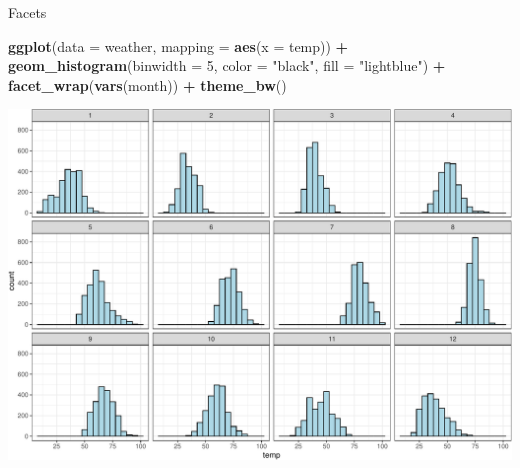 \documentclass[
  ignorenonframetext,
]{beamer}
\newenvironment{Shaded}{\begin{snugshade}}{\end{snugshade}}
\newcommand{\AttributeTok}[1]{\textcolor[rgb]{0.13,0.29,0.53}{#1}}
\newcommand{\DecValTok}[1]{\textcolor[rgb]{0.00,0.00,0.81}{#1}}
\newcommand{\FunctionTok}[1]{\textcolor[rgb]{0.13,0.29,0.53}{\textbf{#1}}}
\newcommand{\NormalTok}[1]{#1}
\newcommand{\SpecialCharTok}[1]{\textcolor[rgb]{0.81,0.36,0.00}{\textbf{#1}}}
\newcommand{\StringTok}[1]{\textcolor[rgb]{0.31,0.60,0.02}{#1}}
\begin{document}
\begin{frame}[fragile]{Facets}
\protect\hypertarget{facets-1}{}
\tiny

\begin{Shaded}
\begin{Highlighting}[]
\FunctionTok{ggplot}\NormalTok{(}\AttributeTok{data =}\NormalTok{ weather, }\AttributeTok{mapping =} \FunctionTok{aes}\NormalTok{(}\AttributeTok{x =}\NormalTok{ temp)) }\SpecialCharTok{+}
  \FunctionTok{geom\_histogram}\NormalTok{(}\AttributeTok{binwidth =} \DecValTok{5}\NormalTok{, }\AttributeTok{color =} \StringTok{"black"}\NormalTok{, }\AttributeTok{fill =} \StringTok{"lightblue"}\NormalTok{) }\SpecialCharTok{+}
  \FunctionTok{facet\_wrap}\NormalTok{(}\FunctionTok{vars}\NormalTok{(month)) }\SpecialCharTok{+} 
  \FunctionTok{theme\_bw}\NormalTok{()}
\end{Highlighting}
\end{Shaded}

\begin{center}\includegraphics[width=0.7\linewidth,height=0.7\textheight]{Week2_Lect_files/figure-beamer/unnamed-chunk-30-1} \end{center}
\normalsize
\end{frame}
\end{document}
